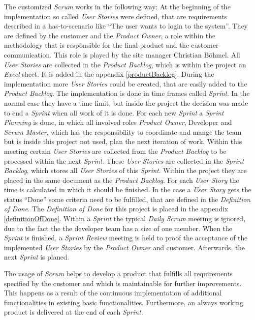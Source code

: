 The  customized \textit{Scrum} works in the following way: At the beginning of the implementation so called \textit{User Stories} were defined, that are requirements described in a has-to-scenario like ``The user wants to login to the system''. They are defined by the customer and the \textit{Product Owner}, a role within the methodology that is responsible for the final product and the customer communication. This role is played by the site manager Christian Böhmel. All \textit{User Stories} are collected in the \textit{Product Backlog}, which is within the project an \textit{Excel} sheet. It is added in the appendix \ref{productBacklog}. During the implementation more \textit{User Stories} could be created, that are easily added to the \textit{Product Backlog}. \newline
The implementation is done in time frames called \textit{Sprint}. In the normal case they have a time limit, but inside the project the decision was made to end a \textit{Sprint} when all work of it is done. For each new \textit{Sprint} a \textit{Sprint Planning} is done, in which all involved roles \textit{Product Owner}, Developer and \textit{Scrum Master}, which has the responsibility to coordinate and mange the team but is inside this project not used, plan the next iteration of work. Within this meeting certain \textit{User Stories} are collected from the \textit{Product Backlog} to be processed within the next \textit{Sprint}. These \textit{User Stories} are collected in the \textit{Sprint Backlog}, which stores all \textit{User Stories} of this \textit{Sprint}. Within the project they are placed in the same document as the \textit{Product Backlog}. For each \textit{User Story} the time is calculated in which it should be finished. In the case a \textit{User Story} gets the status ``Done'' some criteria need to be fulfilled, that are defined in the \textit{Definition of Done}. The \textit{Definition of Done} for this project is placed in the appendix \ref{definitionOfDone}. \newline
Within a \textit{Sprint} the typical \textit{Daily Scrum} meeting is ignored, due to the fact the the developer team has a size of one member. When the \textit{Sprint} is finished, a \textit{Sprint Review} meeting is held to proof the acceptance of the implemented \textit{User Stories} by the \textit{Product Owner} and customer. Afterwards, the next \textit{Sprint} is planed. \parencite{scrum2018} 

The usage of \textit{Scrum} helps to develop a product that fulfills all requirements specified by the customer and which is maintainable for further improvements. This happens as a result of the continuous implementation of additional functionalities in existing basic functionalities. Furthermore, an always working product is delivered at the end of each \textit{Sprint}.

